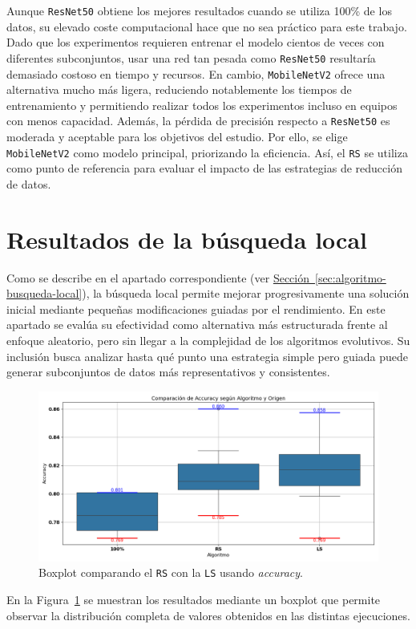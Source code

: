 Aunque \texttt{ResNet50} obtiene los mejores resultados cuando se utiliza 100\% de los datos,
su elevado coste computacional hace que no sea práctico para este trabajo.
Dado que los experimentos requieren entrenar el modelo cientos de veces con diferentes subconjuntos,
usar una red tan pesada como \texttt{ResNet50} resultaría demasiado costoso en tiempo y recursos.
En cambio, \texttt{MobileNetV2} ofrece una alternativa mucho más ligera,
reduciendo notablemente los tiempos de entrenamiento y permitiendo realizar todos los experimentos incluso en equipos con menos capacidad.
Además, la pérdida de precisión respecto a \texttt{ResNet50} es moderada y aceptable para los objetivos del estudio.
Por ello, se elige \texttt{MobileNetV2} como modelo principal, priorizando la eficiencia.
Así, el \texttt{RS} se utiliza como punto de referencia para evaluar el impacto de las estrategias de reducción de datos.


\section{Resultados de la búsqueda local}\label{sec:resultados-busqueda-local}
Como se describe en el apartado correspondiente (ver \hyperref[sec:algoritmo-busqueda-local]{Sección~\ref*{sec:algoritmo-busqueda-local}}),
la búsqueda local permite mejorar progresivamente una solución inicial mediante pequeñas modificaciones guiadas por el rendimiento.
En este apartado se evalúa su efectividad como alternativa más estructurada frente al enfoque aleatorio, pero sin llegar a la complejidad de los algoritmos evolutivos.
Su inclusión busca analizar hasta qué punto una estrategia simple pero guiada puede generar subconjuntos de datos más representativos y consistentes.

\begin{figure}[htp]
    \centering
    \includegraphics[width=1\textwidth]{imagenes/evaluaciones/comparacion_rs-ls.png}
    \caption{Boxplot comparando el \texttt{RS} con la \texttt{LS} usando \textit{accuracy}.}
    \label{fig:aleatorio-vs-busqueda-local}
\end{figure}
En la Figura~\ref{fig:aleatorio-vs-busqueda-local} se muestran los resultados mediante un boxplot que permite observar
la distribución completa de valores obtenidos en las distintas ejecuciones.

